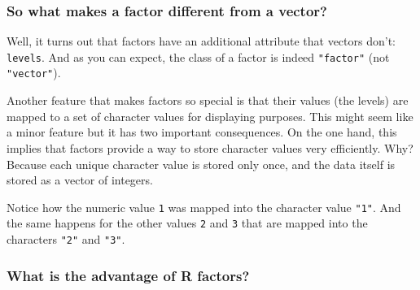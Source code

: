 \documentclass[
]{book}
\newenvironment{Shaded}{\begin{snugshade}}{\end{snugshade}}
\newcommand{\CommentTok}[1]{\textcolor[rgb]{0.56,0.35,0.01}{\textit{#1}}}
\newcommand{\DecValTok}[1]{\textcolor[rgb]{0.00,0.00,0.81}{#1}}
\newcommand{\ErrorTok}[1]{\textcolor[rgb]{0.64,0.00,0.00}{\textbf{#1}}}
\newcommand{\FunctionTok}[1]{\textcolor[rgb]{0.00,0.00,0.00}{#1}}
\newcommand{\NormalTok}[1]{#1}
\newcommand{\SpecialCharTok}[1]{\textcolor[rgb]{0.00,0.00,0.00}{#1}}
\newcommand{\StringTok}[1]{\textcolor[rgb]{0.31,0.60,0.02}{#1}}
\begin{document}
\hypertarget{so-what-makes-a-factor-different-from-a-vector}{%
\subsubsection*{So what makes a factor different from a vector?}\label{so-what-makes-a-factor-different-from-a-vector}}

Well, it turns out that factors have an additional attribute that vectors don't:
\texttt{levels}. And as you can expect, the class of a factor is indeed \texttt{"factor"}
(not \texttt{"vector"}).

\begin{Shaded}
\end{Shaded}

Another feature that makes factors so special is that their values (the levels)
are mapped to a set of character values for displaying purposes. This might
seem like a minor feature but it has two important consequences. On the one
hand, this implies that factors provide a way to store character values very
efficiently. Why? Because each unique character value is stored only once, and
the data itself is stored as a vector of integers.

Notice how the numeric value \texttt{1} was mapped into the character value \texttt{"1"}. And
the same happens for the other values \texttt{2} and \texttt{3} that are mapped into the
characters \texttt{"2"} and \texttt{"3"}.

\hypertarget{what-is-the-advantage-of-r-factors}{%
\subsubsection*{What is the advantage of R factors?}\label{what-is-the-advantage-of-r-factors}}
\end{document}
